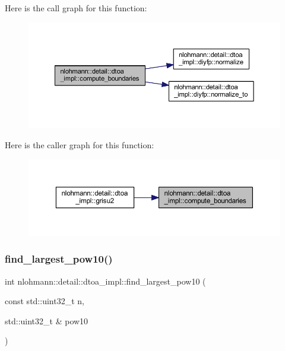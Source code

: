 Here is the call graph for this function\+:
\nopagebreak
\begin{figure}[H]
\begin{center}
\leavevmode
\includegraphics[width=350pt]{namespacenlohmann_1_1detail_1_1dtoa__impl_a22b6e37654ac93c6d0d9c06ec1bf5ded_cgraph}
\end{center}
\end{figure}
Here is the caller graph for this function\+:
\nopagebreak
\begin{figure}[H]
\begin{center}
\leavevmode
\includegraphics[width=350pt]{namespacenlohmann_1_1detail_1_1dtoa__impl_a22b6e37654ac93c6d0d9c06ec1bf5ded_icgraph}
\end{center}
\end{figure}
\mbox{\label{namespacenlohmann_1_1detail_1_1dtoa__impl_a36ded358763b5dbcea9867660fbe4e28}} 
\subsubsection{\texorpdfstring{find\_largest\_pow10()}{find\_largest\_pow10()}}
{\footnotesize\ttfamily int nlohmann\+::detail\+::dtoa\+\_\+impl\+::find\+\_\+largest\+\_\+pow10 (\begin{DoxyParamCaption}\item[{const std\+::uint32\+\_\+t}]{n,  }\item[{std\+::uint32\+\_\+t \&}]{pow10 }\end{DoxyParamCaption})\hspace{0.3cm}{\ttfamily [inline]}}

